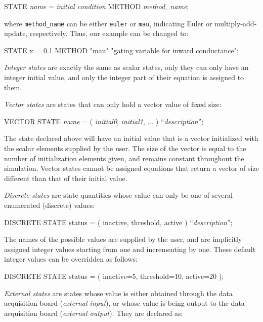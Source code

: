 \begin{example}
        STATE \emph{name} = \emph{initial condition} METHOD \emph{method\_name};
\end{example}

where \texttt{method\_name} can be either \texttt{euler} or \texttt{mau},
indicating Euler or multiply-add-update, respectively. Thus, our
example can be changed to:

\begin{example}
        STATE x = 0.1 METHOD "mau" 
                "gating variable for inward conductance";
\end{example}

\emph{Integer states} are exactly the same as scalar states, only they
can only have an integer initial value, and only the integer part of
their equation is assigned to them.

\emph{Vector states} are states that can only hold a vector value of
fixed size:

\begin{example}
        VECTOR STATE \emph{name} = ( \emph{initial0}, \emph{initial1}, ... ) ``\emph{description}'';
\end{example}

The state declared above will have an initial value that is a vector
initialized with the scalar elements supplied by the user. The size of
the vector is equal to the number of initialization elements given,
and remains constant throughout the simulation. Vector states cannot
be assigned equations that return a vector of size different than that
of their initial value.

\emph{Discrete states} are state quantities whose value can only be one
of several enumerated (discrete) values:

\begin{example}
        DISCRETE STATE status = ( inactive, threshold, active ) ``\emph{description}'';
\end{example}

The names of the possible values are supplied by the user, and are
implicitly assigned integer values starting from one and incrementing
by one. These default integer values can be overridden as follows: 

\begin{example}
        DISCRETE STATE status = ( inactive=5, threshold=10, active=20 );
\end{example}

\emph{External states} are states whose value is either obtained through
the data acquisition board (\emph{external input}), or whose value is
being output to the data acquisition board (\emph{external output}). They
are declared as: 

